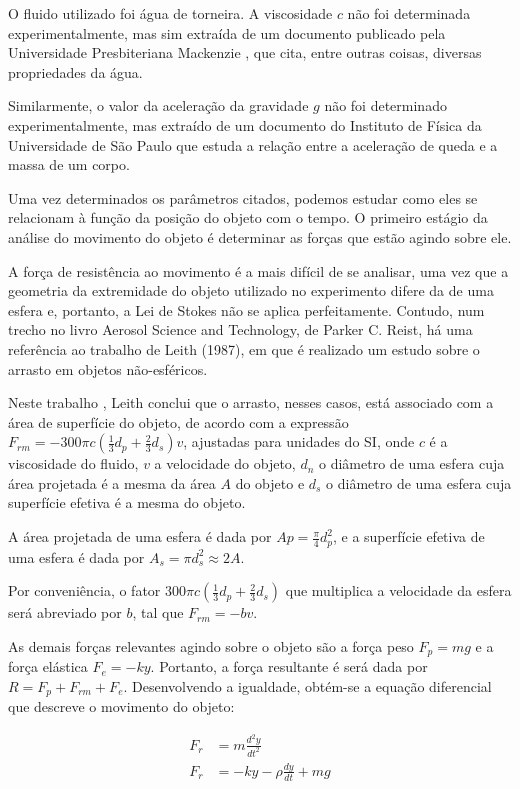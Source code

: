 \documentclass[12pt]{article}
\begin{document}
		
		O fluido utilizado foi água de torneira. A viscosidade $c$ não foi determinada experimentalmente, mas sim extraída de um documento publicado pela Universidade Presbiteriana Mackenzie \cite{mackenzie}, que cita, entre outras coisas, diversas propriedades da água. 

		Similarmente, o valor da aceleração da gravidade $g$ não foi determinado experimentalmente, mas extraído de um documento do Instituto de Física da Universidade de São Paulo \cite{iag} que estuda a relação entre a aceleração de queda e a massa de um corpo.
		
		Uma vez determinados os parâmetros citados, podemos estudar como eles se relacionam à função da posição do objeto com o tempo. O primeiro estágio da análise do movimento do objeto é determinar as forças que estão agindo sobre ele.

		A força de resistência ao movimento é a mais difícil de se analisar, uma vez que a geometria da extremidade do objeto utilizado no experimento difere da de uma esfera e, portanto, a Lei de Stokes não se aplica perfeitamente. Contudo, num trecho no livro Aerosol Science and Technology, de Parker C. Reist, há uma referência ao trabalho de Leith (1987), em que é realizado um estudo sobre o arrasto em objetos não-esféricos.

		Neste trabalho \cite{parker}, Leith conclui que o arrasto, nesses casos, está associado com a área de superfície do objeto, de acordo com a expressão $F_{rm}=-300\pi c (\frac{1}{3}d_p+\frac{2}{3}d_s)v$, ajustadas para unidades do SI, onde $c$ é a viscosidade do fluido, $v$ a velocidade do objeto, $d_n$ o diâmetro de uma esfera cuja área projetada é a mesma da área $A$ do objeto e $d_s$ o diâmetro de uma esfera cuja superfície efetiva é a mesma do objeto.
		
		A área projetada de uma esfera é dada por $Ap=\frac{\pi}{4}d_p^2$, e a superfície efetiva de uma esfera é dada por $A_s=\pi d_s^2 \approx 2A$.
		
		Por conveniência, o fator $300\pi c(\frac{1}{3}d_p+\frac{2}{3}d_s)$ que multiplica a velocidade da esfera será abreviado por $b$, tal que $F_{rm}= -bv$.
		
		As demais forças relevantes agindo sobre o objeto são a força peso $F_p=mg$ e a força elástica $F_e= -ky$. Portanto, a força resultante é será dada por $R=F_p+F_{rm}+F_e$. Desenvolvendo a igualdade, obtém-se a equação diferencial que descreve o movimento do objeto:
		
		\begin{align} 
			F_r &= m\frac{d^2y}{dt^2} \label{eq:equacao_1} \\
			F_r &= -ky -\rho\frac{dy}{dt} + mg \label{eq:equacao_2}
		\end{align}
		
\end{document}
